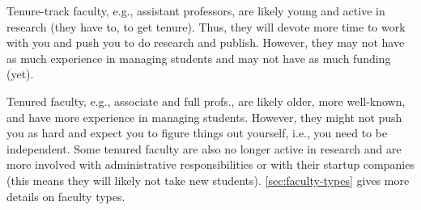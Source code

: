 \documentclass[oneside,11pt,dvipsnames]{book}
\newenvironment{commentbox}[1][]{
  \small
  \begin{mybox}
    {\small \textbf{#1}}
  }{
  \end{mybox}
}
\begin{document}
Tenure-track faculty, e.g., assistant professors, are likely young and active in research (they have to, to get tenure). Thus, they will devote more time to work with you and push you to do research and publish. However, they may not have as much experience in managing students and may not have as much funding (yet).

Tenured faculty, e.g., associate and full profs., are likely older, more well-known, and have more experience in managing students.  However, they might not push you as hard and expect you to figure things out yourself, i.e., you need to be independent.  Some tenured faculty are also no longer active in research and are more involved with administrative responsibilities or with their startup companies (this means they will likely not take new students). \autoref{sec:faculty-types} gives more details on faculty types.


\end{document}

